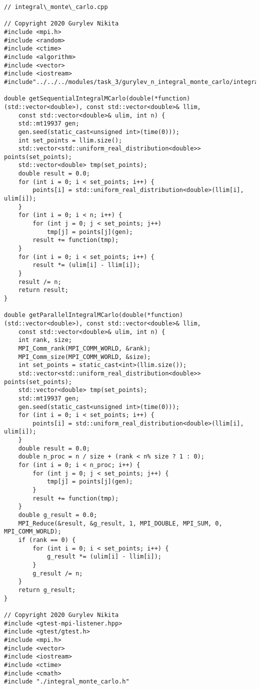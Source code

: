 \documentclass{report}
\begin{document}
\begin{lstlisting}
// integral\_monte\_carlo.cpp

// Copyright 2020 Gurylev Nikita
#include <mpi.h>
#include <random>
#include <ctime>
#include <algorithm>
#include <vector>
#include <iostream>
#include"../../../modules/task_3/gurylev_n_integral_monte_carlo/integral_monte_carlo.h"

double getSequentialIntegralMCarlo(double(*function)(std::vector<double>), const std::vector<double>& llim,
    const std::vector<double>& ulim, int n) {
    std::mt19937 gen;
    gen.seed(static_cast<unsigned int>(time(0)));
    int set_points = llim.size();
    std::vector<std::uniform_real_distribution<double>> points(set_points);
    std::vector<double> tmp(set_points);
    double result = 0.0;
    for (int i = 0; i < set_points; i++) {
        points[i] = std::uniform_real_distribution<double>(llim[i], ulim[i]);
    }
    for (int i = 0; i < n; i++) {
        for (int j = 0; j < set_points; j++)
            tmp[j] = points[j](gen);
        result += function(tmp);
    }
    for (int i = 0; i < set_points; i++) {
        result *= (ulim[i] - llim[i]);
    }
    result /= n;
    return result;
}

double getParallelIntegralMCarlo(double(*function)(std::vector<double>), const std::vector<double>& llim,
    const std::vector<double>& ulim, int n) {
    int rank, size;
    MPI_Comm_rank(MPI_COMM_WORLD, &rank);
    MPI_Comm_size(MPI_COMM_WORLD, &size);
    int set_points = static_cast<int>(llim.size());
    std::vector<std::uniform_real_distribution<double>> points(set_points);
    std::vector<double> tmp(set_points);
    std::mt19937 gen;
    gen.seed(static_cast<unsigned int>(time(0)));
    for (int i = 0; i < set_points; i++) {
        points[i] = std::uniform_real_distribution<double>(llim[i], ulim[i]);
    }
    double result = 0.0;
    double n_proc = n / size + (rank < n% size ? 1 : 0);
    for (int i = 0; i < n_proc; i++) {
        for (int j = 0; j < set_points; j++) {
            tmp[j] = points[j](gen);
        }
        result += function(tmp);
    }
    double g_result = 0.0;
    MPI_Reduce(&result, &g_result, 1, MPI_DOUBLE, MPI_SUM, 0, MPI_COMM_WORLD);
    if (rank == 0) {
        for (int i = 0; i < set_points; i++) {
            g_result *= (ulim[i] - llim[i]);
        }
        g_result /= n;
    }
    return g_result;
}

// Copyright 2020 Gurylev Nikita
#include <gtest-mpi-listener.hpp>
#include <gtest/gtest.h>
#include <mpi.h>
#include <vector>
#include <iostream>
#include <ctime>
#include <cmath>
#include "./integral_monte_carlo.h"


\end{lstlisting}
\end{document}
